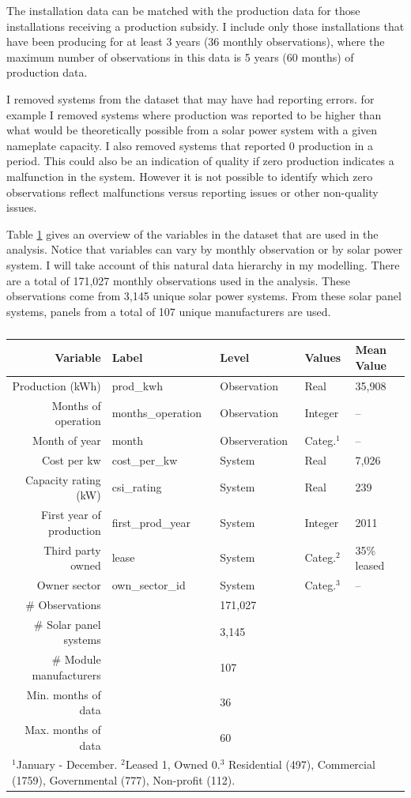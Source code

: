 \documentclass[12pt]{article}
\begin{document}
The installation data can be matched with the production data for those installations receiving a production subsidy. I include only those installations that have been producing for at least 3 years (36 monthly observations), where the maximum number of observations in this data is 5 years (60 months) of production data.

I removed systems from the dataset that may have had reporting errors. for example I removed systems where production was reported to be higher than what would be theoretically possible from a solar power system with a given nameplate capacity. I also removed systems that reported 0 production in a period. This could also be an indication of quality if zero production indicates a malfunction in the system. However it is not possible to identify which zero observations reflect malfunctions versus reporting issues or other non-quality issues.

Table \ref{tbl:variables} gives an overview of the variables in the dataset that are used in the analysis. Notice that variables can vary by monthly observation or by solar power system. I will take account of this natural data hierarchy in my modelling. There are a total of 171,027 monthly observations used in the analysis. These observations come from 3,145 unique solar power systems. From these solar panel systems, panels from a total of 107 unique manufacturers are used.

\begin{table}
  \begin{tabular}{rllll}
  \toprule
    Variable &  Label &   Level & Values &   Mean Value  \\
    \midrule
    Production (kWh) &  prod\_kwh &  Observation & Real & 35,908   \\
    Months of operation &  months\_operation &  Observation & Integer & --   \\
    Month of year & month & Observeration & Categ.$^{1}$& -- \\
    Cost per kw & cost\_per\_kw & System & Real & 7,026 \\
    Capacity rating (kW) & csi\_rating & System & Real & 239 \\
    First year of production & first\_prod\_year & System & Integer & 2011 \\
    Third party owned & lease & System & Categ.$^{2}$  &  35\% leased \\
    Owner sector & own\_sector\_id & System & Categ.$^{3}$& -- \\
    \midrule
    \# Observations && 171,027 && \\
    \# Solar panel systems && 3,145 && \\
    \# Module manufacturers && 107 && \\
     Min. months of data && 36 && \\
     Max. months of data && 60 && \\
  \bottomrule
    \multicolumn{5}{l}{\scriptsize{$^{1}$January - December. $^{2}$Leased 1, Owned 0.$^{3}$ Residential (497), Commercial (1759), Governmental (777), Non-profit (112).}}
  \end{tabular}
  \label{tbl:variables}
  \caption{}
\end{table}
\end{document}
